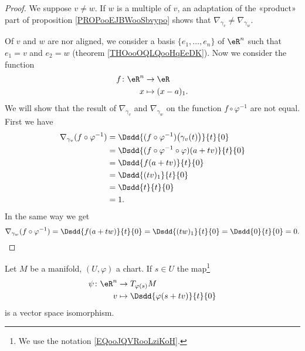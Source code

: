\begin{proof}
    We suppose \( v\neq w\). If \( w\) is a multiple of \( v\), an adaptation of the «product» part of proposition \ref{PROPooEJBWooSbvypo} shows that \( \nabla_{\gamma_v}\neq \nabla_{\gamma_w}\).

    Of \( v\) and \( w\) are nor aligned, we consider a basis \( \{ e_1,\ldots, e_n \}\) of \( \eR^n\) such that \( e_1=v\) and \( e_2=w\) (theorem \ref{THOooOQLQooHqEeDK}). Now we consider the function
    \begin{equation}
        \begin{aligned}
            f\colon \eR^n&\to \eR \\
            x&\mapsto (x-a)_1. 
        \end{aligned}
    \end{equation}
    We will show that the result of \( \nabla_{\gamma_v}\) and \( \nabla_{\gamma_w}\) on the function \( f\circ\varphi^{-1}\) are not equal. First we have
    \begin{subequations}
        \begin{align}
            \nabla_{\gamma_v}(f\circ\varphi^{-1})&=\Dsdd{ (f\circ\varphi^{-1})\big( \gamma_v(t) \big) }{t}{0}\\
            &=\Dsdd{ (f\circ\varphi^{-1}\circ\varphi)(a+tv) }{t}{0}\\
            &=\Dsdd{ f(a+tv) }{t}{0}\\
            &=\Dsdd{ (tv)_1 }{t}{0}\\
            &=\Dsdd{ t }{t}{0}\\
            &=1.
        \end{align}
    \end{subequations}
    In the same way we get
    \begin{equation}
        \nabla_{\gamma_w}(f\circ\varphi^{-1})=\Dsdd{ f(a+tw) }{t}{0}=\Dsdd{ (tw)_1 }{t}{0}=\Dsdd{ 0 }{t}{0}=0.
    \end{equation}
\end{proof}


\begin{proposition}     \label{PROPooMEPPooRonxuh}
    Let \( M\) be a manifold, \( (U, \varphi)\) a chart. If \( s\in U\) the map\footnote{We use the notation \eqref{EQooJQVRooLziKoH}.}
    \begin{equation}        \label{EQooJMTJooZNzREy}
        \begin{aligned}
            \psi\colon \eR^n&\to T_{\varphi(s)}M \\
            v&\mapsto \Dsdd{ \varphi(s+tv) }{t}{0} 
        \end{aligned}
    \end{equation}
    is a vector space isomorphism.
\end{proposition}


